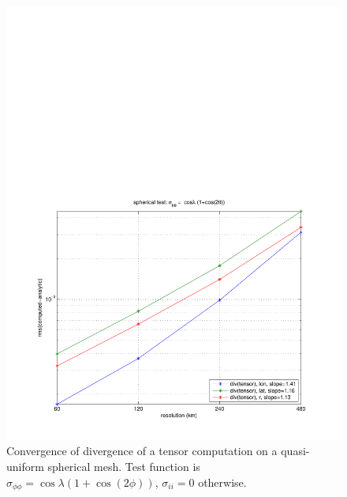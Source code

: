 \documentclass[11pt]{report}
\begin{document}
\begin{figure}[htbp]
 \center
 \includegraphics[scale=0.8, trim = 0 0 0 4in, clip]{f/a19_sph_conv_test_4.pdf}
 \caption{Convergence of divergence of a tensor computation on a quasi-uniform spherical mesh.  Test function is $\sigma_{\phi\phi}=\cos \lambda (1+\cos(2\phi))$, $\sigma_{ii}=0$ otherwise.}
 \label{fig:convergence4}
\end{figure}






\end{document}
